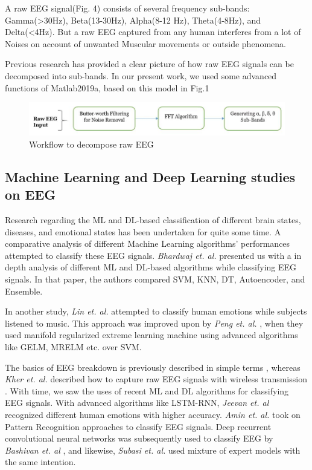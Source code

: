 \documentclass[conference]{IEEEtran}
\begin{document}
A raw EEG signal(Fig. 4) consists of several frequency sub-bands: Gamma(\textgreater30Hz), Beta(13-30Hz), Alpha(8-12 Hz), Theta(4-8Hz), and Delta(\textless4Hz). But a raw EEG captured from any human interferes from a lot of Noises on account of unwanted Muscular movements or outside phenomena\cite{b14}. 

Previous research \cite{b3} has provided a clear picture of how raw EEG signals can be decomposed into sub-bands. In our present work, we used some advanced functions of Matlab2019a, based on this model in Fig.1


\begin{figure}[htbp]
\centerline{\includegraphics[scale=.4]{figures/Decomposing_wf.JPG}}
\caption{Workflow to decompose raw EEG}
\label{fig}
\end{figure}



\subsection{Machine Learning and Deep Learning studies on EEG}
Research regarding the ML and DL-based classification of different brain states, diseases, and emotional states has been undertaken for quite some time. A comparative analysis of different Machine Learning algorithms’ performances \cite{b1, b8} attempted to classify these EEG signals.  \textit{Bhardwaj et. al.} \cite{b9} presented us with a in depth analysis of different ML and DL-based algorithms while classifying EEG signals. In that paper, the authors compared SVM, KNN, DT, Autoencoder, and Ensemble.

In another study, \textit{Lin et. al.} \cite{b6} attempted to classify human emotions while subjects listened to music.  This approach was improved upon by \textit{Peng et. al.} \cite{b7}, when they used manifold regularized extreme learning machine using advanced algorithms like GELM, MRELM etc. over SVM.

The basics of EEG breakdown is previously described in simple terms \cite{b3}, whereas \textit{Kher et. al.} described how to capture raw EEG signals with wireless transmission \cite{b14}.  With time, we saw the uses of recent ML and DL algorithms for classifying EEG signals.  With advanced algorithms like LSTM-RNN, \textit{Jeevan et. al} \cite{b4} recognized different human emotions with higher accuracy.  \textit{Amin et. al.} \cite{b10} took on Pattern Recognition approaches to classify EEG signals.  Deep recurrent convolutional neural networks was subsequently used to classify EEG by \textit{Bashivan et. al} \cite{b11}, and likewise, \textit{Subasi et. al.} \cite{b13} used mixture of expert models with the same intention. 
\end{document}
